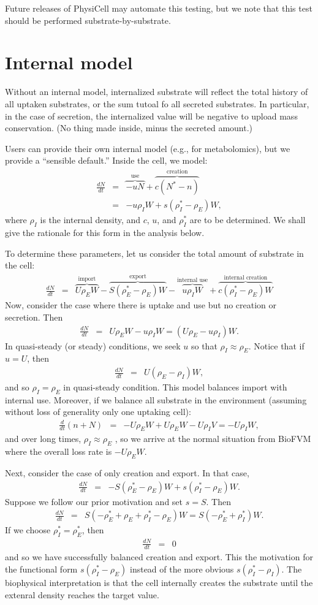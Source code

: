 \documentclass[11point]{article}
\newcommand{\beq}{\begin{eqnarray}}
\newcommand{\eeq}{\end{eqnarray}}
\begin{document}
Future releases of PhysiCell may automate this testing, but we note that this test should be performed 
substrate-by-substrate. 

\section{Internal model}
Without an internal model, internalized substrate will reflect the total history of 
all uptaken substrates, or the sum tutoal fo all secreted substrates.  In particular, 
in the case of secretion, the internalized value will be negative to upload mass conservation. (No thing made inside, minus the secreted amount.) 

Users can provide their own internal model (e.g., for metabolomics), but we provide a ``sensible default.'' Inside the cell, we model: 
\beq
\frac{dN}{dt} & = & \overbrace{-u N}^\textrm{use} + \overbrace{c ( N^* -  n)}^\textrm{creation} \\
& = & 
-u \rho_I W + s( \rho_I^* - \rho_E ) W, 
\eeq
where $\rho_I$ is the internal density, and $c$, $u$, and $\rho_I^*$ are to be determined. We shall give the rationale for this form in the analysis below. 

To determine these parameters, let us consider the total amount of substrate in the cell: 
\beq
\frac{dN}{dt} & =& 
\overbrace{ U \rho_E W  }^\textrm{import} 
- 
\overbrace{ S \left( \rho_E^* - \rho_E \right) W }^\textrm{export} 
- 
\overbrace{ u \rho_I W }^\textrm{internal use} 
+ 
\overbrace{ c \left( \rho_I^* - \rho_E \right)W  }^\textrm{internal creation}
\eeq
Now, consider the case where there is uptake and use but no creation or secretion. Then 
\beq
\frac{dN}{dt} & = & 
U\rho_E W - u \rho_I W = \left( U \rho_E - u \rho_I \right) W. 
\eeq
In quasi-steady (or steady) conditions, we seek $u$ so that 
$\rho_I \approx \rho_E$. Notice that if $u = U$, then 
\beq
\frac{dN}{dt}  & = & U \left( \rho_E - \rho_I \right) W, 
\eeq
and so $\rho_I = \rho_E$ in quasi-steady condition. This model 
balances import with internal use. Moreover, if we balance all substrate in the 
environment (assuming without loss of generality only one uptaking cell): 
\beq
\frac{d}{dt} \left( n + N \right) & = &
- U \rho_E W + U \rho_E W - U \rho_I V = - U \rho_I W, 
\eeq
and over long times, $\rho_I \approx \rho_E$ , so we arrive at the 
normal situation from BioFVM where the overall loss rate is 
$- U \rho_E W$. 

Next, consider the case of only creation and export. In that case, 
\beq
\frac{dN}{dt} & = & 
-S ( \rho_E^* - \rho_E ) W + s ( \rho_I^* - \rho_E) W. 
\eeq
Suppose we follow our prior motivation and set $s = S$. Then 
\beq
\frac{dN}{dt} & = & 
S \left( - \rho_E^*  + \rho_E + \rho_I^* - \rho_E \right) W 
= S \left( -\rho_E^* + \rho_I^* \right)W. 
\eeq
If we choose $\rho_I^* = \rho_E^*$, then 
\beq
\frac{dN}{dt} &  = & 0
\eeq
and so we have successfully balanced creation and export. This the 
motivation for the functional form $s ( \rho_I^* - \rho_E)$ instead 
of the more obvious $s ( \rho_I^* - \rho_I)$. The biophysical interpretation 
is that the cell internally creates the substrate until the extenral density 
reaches the target value. 
\end{document}
